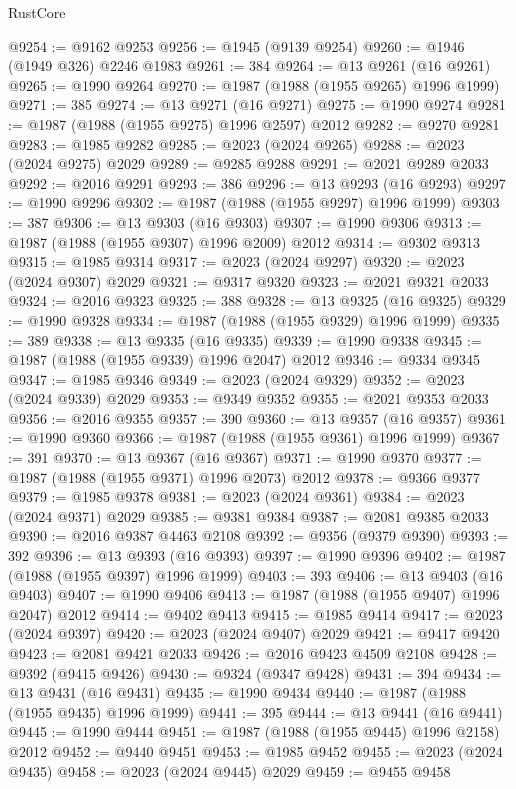\begin{lexlean}{RustCore}
\begin{coremodule}
@9254 := @9162 @9253
@9256 := @1945 (@9139 @9254)
@9260 := @1946 (@1949 @326) @2246 @1983
@9261 := 384
@9264 := @13 @9261 (@16 @9261)
@9265 := @1990 @9264
@9270 := @1987 (@1988 (@1955 @9265) @1996 @1999)
@9271 := 385
@9274 := @13 @9271 (@16 @9271)
@9275 := @1990 @9274
@9281 := @1987 (@1988 (@1955 @9275) @1996 @2597) @2012
@9282 := @9270 @9281
@9283 := @1985 @9282
@9285 := @2023 (@2024 @9265)
@9288 := @2023 (@2024 @9275) @2029
@9289 := @9285 @9288
@9291 := @2021 @9289 @2033
@9292 := @2016 @9291
@9293 := 386
@9296 := @13 @9293 (@16 @9293)
@9297 := @1990 @9296
@9302 := @1987 (@1988 (@1955 @9297) @1996 @1999)
@9303 := 387
@9306 := @13 @9303 (@16 @9303)
@9307 := @1990 @9306
@9313 := @1987 (@1988 (@1955 @9307) @1996 @2009) @2012
@9314 := @9302 @9313
@9315 := @1985 @9314
@9317 := @2023 (@2024 @9297)
@9320 := @2023 (@2024 @9307) @2029
@9321 := @9317 @9320
@9323 := @2021 @9321 @2033
@9324 := @2016 @9323
@9325 := 388
@9328 := @13 @9325 (@16 @9325)
@9329 := @1990 @9328
@9334 := @1987 (@1988 (@1955 @9329) @1996 @1999)
@9335 := 389
@9338 := @13 @9335 (@16 @9335)
@9339 := @1990 @9338
@9345 := @1987 (@1988 (@1955 @9339) @1996 @2047) @2012
@9346 := @9334 @9345
@9347 := @1985 @9346
@9349 := @2023 (@2024 @9329)
@9352 := @2023 (@2024 @9339) @2029
@9353 := @9349 @9352
@9355 := @2021 @9353 @2033
@9356 := @2016 @9355
@9357 := 390
@9360 := @13 @9357 (@16 @9357)
@9361 := @1990 @9360
@9366 := @1987 (@1988 (@1955 @9361) @1996 @1999)
@9367 := 391
@9370 := @13 @9367 (@16 @9367)
@9371 := @1990 @9370
@9377 := @1987 (@1988 (@1955 @9371) @1996 @2073) @2012
@9378 := @9366 @9377
@9379 := @1985 @9378
@9381 := @2023 (@2024 @9361)
@9384 := @2023 (@2024 @9371) @2029
@9385 := @9381 @9384
@9387 := @2081 @9385 @2033
@9390 := @2016 @9387 @4463 @2108
@9392 := @9356 (@9379 @9390)
@9393 := 392
@9396 := @13 @9393 (@16 @9393)
@9397 := @1990 @9396
@9402 := @1987 (@1988 (@1955 @9397) @1996 @1999)
@9403 := 393
@9406 := @13 @9403 (@16 @9403)
@9407 := @1990 @9406
@9413 := @1987 (@1988 (@1955 @9407) @1996 @2047) @2012
@9414 := @9402 @9413
@9415 := @1985 @9414
@9417 := @2023 (@2024 @9397)
@9420 := @2023 (@2024 @9407) @2029
@9421 := @9417 @9420
@9423 := @2081 @9421 @2033
@9426 := @2016 @9423 @4509 @2108
@9428 := @9392 (@9415 @9426)
@9430 := @9324 (@9347 @9428)
@9431 := 394
@9434 := @13 @9431 (@16 @9431)
@9435 := @1990 @9434
@9440 := @1987 (@1988 (@1955 @9435) @1996 @1999)
@9441 := 395
@9444 := @13 @9441 (@16 @9441)
@9445 := @1990 @9444
@9451 := @1987 (@1988 (@1955 @9445) @1996 @2158) @2012
@9452 := @9440 @9451
@9453 := @1985 @9452
@9455 := @2023 (@2024 @9435)
@9458 := @2023 (@2024 @9445) @2029
@9459 := @9455 @9458

\end{coremodule}
\end{lexlean}
